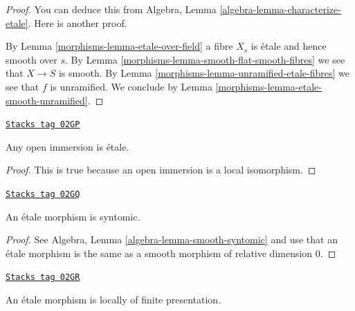 \begin{proof}

You can deduce this from
Algebra, Lemma \ref{algebra-lemma-characterize-etale}.
Here is another proof.

\medskip\noindent
By Lemma \ref{morphisms-lemma-etale-over-field} a fibre $X_s$ is \'etale
and hence smooth over $s$. By Lemma \ref{morphisms-lemma-smooth-flat-smooth-fibres}
we see that $X \to S$ is smooth.
By Lemma \ref{morphisms-lemma-unramified-etale-fibres}
we see that $f$ is unramified. We conclude by
Lemma \ref{morphisms-lemma-etale-smooth-unramified}.
\end{proof}

\begin{lemma}
\label{morphisms-lemma-open-immersion-etale}
\href{https://stacks.math.columbia.edu/tag/02GP}{\texttt{Stacks tag 02GP}}

Any open immersion is \'etale.
\end{lemma}

\begin{proof}
This is true because an open immersion is a local isomorphism.
\end{proof}

\begin{lemma}
\label{morphisms-lemma-etale-syntomic}
\href{https://stacks.math.columbia.edu/tag/02GQ}{\texttt{Stacks tag 02GQ}}

An \'etale morphism is syntomic.
\end{lemma}

\begin{proof}
See Algebra, Lemma \ref{algebra-lemma-smooth-syntomic} and use that an
\'etale morphism is the same as a smooth morphism of relative dimension $0$.
\end{proof}

\begin{lemma}
\label{morphisms-lemma-etale-locally-finite-presentation}
\href{https://stacks.math.columbia.edu/tag/02GR}{\texttt{Stacks tag 02GR}}

An \'etale morphism is locally of finite presentation.
\end{lemma}

